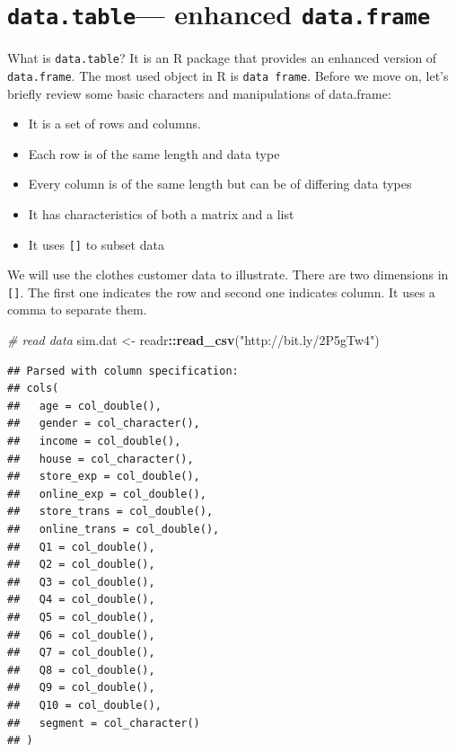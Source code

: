 \documentclass[12pt,]{krantz}
\makeatletter
\newenvironment{Shaded}{\begin{snugshade}}{\end{snugshade}}
\newcommand{\CommentTok}[1]{\textcolor[rgb]{0.37,0.37,0.37}{\textit{#1}}}
\newcommand{\KeywordTok}[1]{\textcolor[rgb]{0.27,0.27,0.27}{\textbf{#1}}}
\newcommand{\NormalTok}[1]{#1}
\newcommand{\OperatorTok}[1]{\textcolor[rgb]{0.43,0.43,0.43}{\textbf{#1}}}
\newcommand{\StringTok}[1]{\textcolor[rgb]{0.5,0.5,0.5}{#1}}
\providecommand{\tightlist}{%
  \setlength{\itemsep}{0pt}\setlength{\parskip}{0pt}}
\newenvironment{kframe}{%
\medskip{}
\setlength{\fboxsep}{.8em}
 \def\at@end@of@kframe{}%
 \ifinner\ifhmode%
  \def\at@end@of@kframe{\end{minipage}}%
  \begin{minipage}{\columnwidth}%
 \fi\fi%
 \def\FrameCommand##1{\hskip\@totalleftmargin \hskip-\fboxsep
 \colorbox{shadecolor}{##1}\hskip-\fboxsep
     \hskip-\linewidth \hskip-\@totalleftmargin \hskip\columnwidth}%
 \MakeFramed {\advance\hsize-\width
   \@totalleftmargin\z@ \linewidth\hsize
   \@setminipage}}%
 {\par\unskip\endMakeFramed%
 \at@end@of@kframe}
\renewenvironment{Shaded}{\begin{kframe}}{\end{kframe}}
\makeatother
\begin{document}
\hypertarget{data.table-enhanced-data.frame}{%
\section{\texorpdfstring{\texttt{data.table}--- enhanced \texttt{data.frame}}{data.table--- enhanced data.frame}}\label{data.table-enhanced-data.frame}}

What is \texttt{data.table}? It is an R package that provides an enhanced version of \texttt{data.frame}. The most used object in R is \texttt{data\ frame}. Before we move on, let's briefly review some basic characters and manipulations of data.frame:

\begin{itemize}
\tightlist
\item
  It is a set of rows and columns.
\item
  Each row is of the same length and data type
\item
  Every column is of the same length but can be of differing data types
\item
  It has characteristics of both a matrix and a list
\item
  It uses \texttt{{[}{]}} to subset data
\end{itemize}

We will use the clothes customer data to illustrate. There are two dimensions in \texttt{{[}{]}}. The first one indicates the row and second one indicates column. It uses a comma to separate them.

\begin{Shaded}
\begin{Highlighting}[]
\CommentTok{# read data}
\NormalTok{sim.dat <-}\StringTok{ }\NormalTok{readr}\OperatorTok{::}\KeywordTok{read_csv}\NormalTok{(}\StringTok{"http://bit.ly/2P5gTw4"}\NormalTok{)}
\end{Highlighting}
\end{Shaded}

\begin{verbatim}
## Parsed with column specification:
## cols(
##   age = col_double(),
##   gender = col_character(),
##   income = col_double(),
##   house = col_character(),
##   store_exp = col_double(),
##   online_exp = col_double(),
##   store_trans = col_double(),
##   online_trans = col_double(),
##   Q1 = col_double(),
##   Q2 = col_double(),
##   Q3 = col_double(),
##   Q4 = col_double(),
##   Q5 = col_double(),
##   Q6 = col_double(),
##   Q7 = col_double(),
##   Q8 = col_double(),
##   Q9 = col_double(),
##   Q10 = col_double(),
##   segment = col_character()
## )
\end{verbatim}
\end{document}
